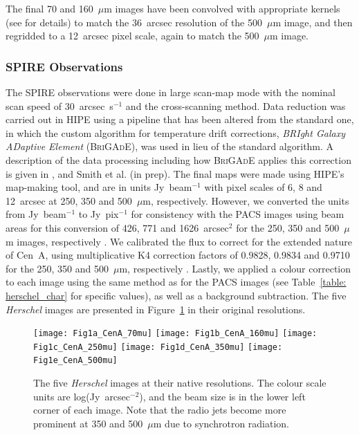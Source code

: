 \documentclass[useAMS,usenatbib,usegraphicx]{mn2e}
\begin{document}
The final 70 and 160~$\mu$m images have been convolved with appropriate kernels (see \citet{Bendo_2011_submit} for details) to match the 36~arcsec resolution of the 500~$\mu$m image, and then regridded to a 12~arcsec pixel scale, again to match the 500~$\mu$m image.

\subsubsection{SPIRE Observations}\label{subsubsec:SPIRE}
The SPIRE observations were done in large scan-map mode with the nominal scan speed of 30~arcsec~s$^{-1}$ and the cross-scanning method.  Data reduction was carried out in HIPE using a pipeline that has been altered from the standard one, in which the custom algorithm for temperature drift corrections, \emph{BRIght Galaxy ADaptive Element} (\textsc{BriGAdE}), was used in lieu of the standard algorithm.  A description of the data processing including how \textsc{BriGAdE} applies this correction is given in \citet{Auld_2011_submit}, \citet{Smith_2012_in_press} and Smith et al. (in prep).  The final maps were made using HIPE's map-making tool, and are in units Jy~beam$^{-1}$ with pixel scales of 6, 8 and 12~arcsec at 250, 350 and 500~$\mu$m, respectively.  However, we converted the units from Jy~beam$^{-1}$ to Jy~pix$^{-1}$ for consistency with the PACS images using beam areas for this conversion of 426, 771 and 1626~arcsec$^{2}$ for the 250, 350 and 500~$\mu$m images, respectively \citep{SOM_2010}.  We calibrated the flux to correct for the extended nature of Cen~A, using multiplicative K4 correction factors of 0.9828, 0.9834 and 0.9710 for the 250, 350 and 500~$\mu$m, respectively \citep{SOM_2010}.  Lastly, we applied a colour correction to each image using the same method as for the PACS images (see Table~\ref{table: herschel_char} for specific values), as well as a background subtraction. The five \emph{Herschel} images are presented in Figure~\ref{fig:Herschel_maps} in their original resolutions.

\begin{figure}
\texttt{[image: Fig1a\_CenA\_70mu]}
\texttt{[image: Fig1b\_CenA\_160mu]}
\texttt{[image: Fig1c\_CenA\_250mu]}
\texttt{[image: Fig1d\_CenA\_350mu]}
\texttt{[image: Fig1e\_CenA\_500mu]}
\caption{The five \emph{Herschel} images at their native resolutions.  The colour scale units are log(Jy~arcsec$^{-2}$), and the beam size is in the lower left corner of each image.  Note that the radio jets become more prominent at 350 and 500~$\mu$m due to synchrotron radiation.}
\label{fig:Herschel_maps}
\end{figure}
\end{document}
